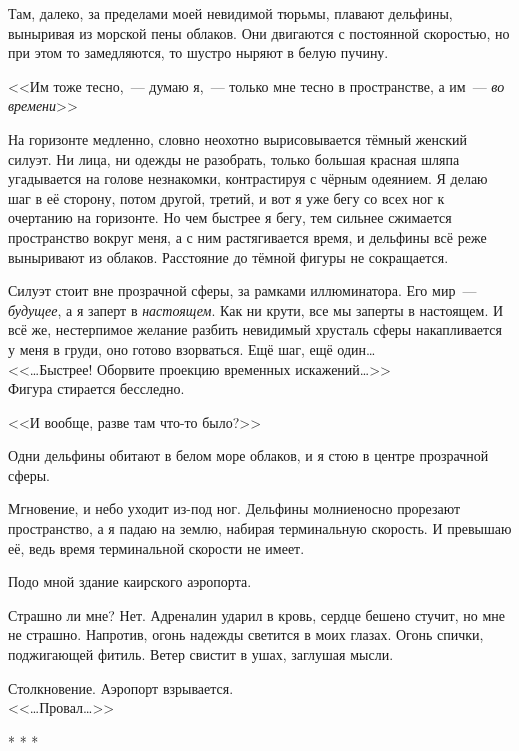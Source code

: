 \documentclass[openany, oneside]{book}
\begin{document}
Там, далеко, за пределами моей невидимой тюрьмы, плавают дельфины, выныривая из морской пены облаков. Они двигаются с постоянной скоростью, но при этом то замедляются, то шустро ныряют в белую пучину.

<<Им тоже тесно,~--- думаю я,~--- только мне тесно в пространстве, а им~--- \textit{во времени}>>

На горизонте медленно, словно неохотно вырисовывается тёмный женский силуэт. Ни лица, ни одежды не разобрать, только большая красная шляпа угадывается на голове незнакомки, контрастируя с чёрным одеянием. Я делаю шаг в её сторону, потом другой, третий, и вот я уже бегу со всех ног к очертанию на горизонте. Но чем быстрее я бегу, тем сильнее сжимается пространство вокруг меня, а с ним растягивается время, и дельфины всё реже выныривают из облаков. Расстояние до тёмной фигуры не сокращается.

Силуэт стоит вне прозрачной сферы, за рамками иллюминатора. Его мир~--- \textit{будущее}, а я заперт в \textit{настоящем}. Как ни крути, все мы заперты в настоящем. И всё же, нестерпимое желание разбить невидимый хрусталь сферы накапливается у меня в груди, оно готово взорваться. Ещё шаг, ещё один\dots\\

<<\dots Быстрее! Оборвите проекцию временных искажений\dots>>\\

Фигура стирается бесследно.

<<И вообще, разве там что-то было?>>

Одни дельфины обитают в белом море облаков, и я стою в центре прозрачной сферы.

Мгновение, и небо уходит из-под ног. Дельфины молниеносно прорезают пространство, а я падаю на землю, набирая терминальную скорость. И превышаю её, ведь время терминальной скорости не имеет.

Подо мной здание каирского аэропорта.

Страшно ли мне? Нет. Адреналин ударил в кровь, сердце бешено стучит, но мне не страшно. Напротив, огонь надежды светится в моих глазах. Огонь спички, поджигающей фитиль. Ветер свистит в ушах, заглушая мысли.


Столкновение. Аэропорт взрывается.\\

<<\dots Провал\dots>>

\begin{center}
    * * *
\end{center}
\end{document}
